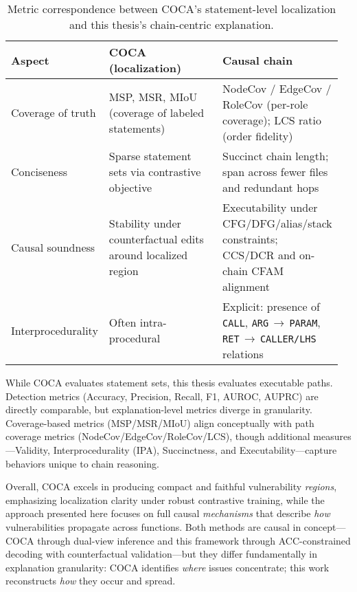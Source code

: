 \documentclass{buthesis}
\begin{document}
\begin{table}[H]
\centering
\small
\setlength{\tabcolsep}{3pt}
\renewcommand{\arraystretch}{1.08}
\caption{Metric correspondence between COCA’s statement-level localization and this thesis’s chain-centric explanation.}
\label{tab:coca-align}
\begin{tabular}{p{0.26\linewidth} p{0.36\linewidth} p{0.34\linewidth}}
\toprule
\textbf{Aspect} & \textbf{COCA (localization)} & \textbf{Causal chain}\\
\midrule
Coverage of truth & MSP, MSR, MIoU (coverage of labeled statements) & NodeCov / EdgeCov / RoleCov (per-role coverage); LCS ratio (order fidelity)\\
Conciseness & Sparse statement sets via contrastive objective & Succinct chain length; span across fewer files and redundant hops \\
Causal soundness & Stability under counterfactual edits around localized region & Executability under CFG/DFG/alias/stack constraints; CCS/DCR and on-chain CFAM alignment \\
Interprocedurality & Often intra-procedural & Explicit: presence of \texttt{CALL}, \texttt{ARG}\,$\to$\,\texttt{PARAM}, \texttt{RET}\,$\to$\,\texttt{CALLER/LHS} relations\\
\bottomrule
\end{tabular}
\end{table}

While COCA evaluates statement sets, this thesis evaluates executable paths. Detection metrics (Accuracy, Precision, Recall, F1, AUROC, AUPRC) are directly comparable, but explanation-level metrics diverge in granularity. Coverage-based metrics (MSP/MSR/MIoU) align conceptually with path coverage metrics (NodeCov/EdgeCov/RoleCov/LCS), though additional measures—Validity, Interprocedurality (IPA), Succinctness, and Executability—capture behaviors unique to chain reasoning.

Overall, COCA excels in producing compact and faithful vulnerability \emph{regions}, emphasizing localization clarity under robust contrastive training, while the approach presented here focuses on full causal \emph{mechanisms} that describe \emph{how} vulnerabilities propagate across functions. Both methods are causal in concept—COCA through dual-view inference and this framework through ACC-constrained decoding with counterfactual validation—but they differ fundamentally in explanation granularity: COCA identifies \emph{where} issues concentrate; this work reconstructs \emph{how} they occur and spread.
\end{document}
